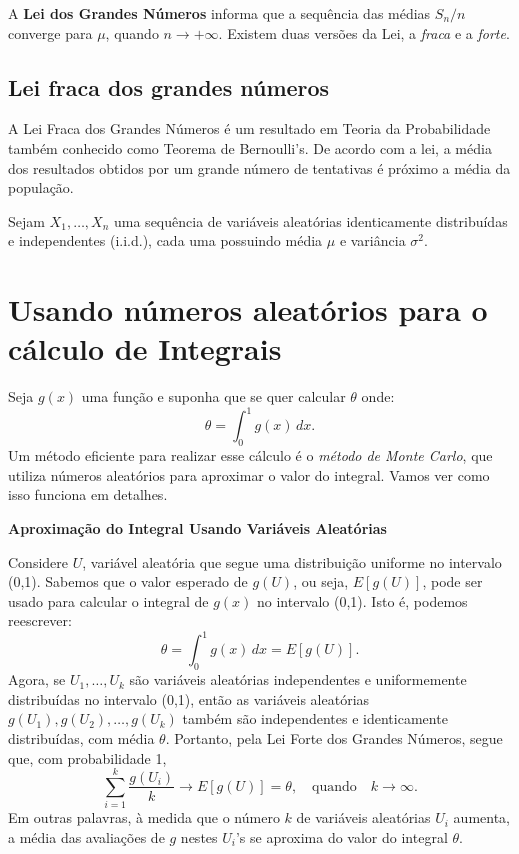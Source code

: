 \documentclass[
]{book}
\begin{document}
A \textbf{Lei dos Grandes Números} informa que a sequência das médias \(S_n/n\) converge para \(\mu\), quando \(n\to +\infty\). Existem duas versões da Lei, a \emph{fraca} e a \emph{forte}.

\section{Lei fraca dos grandes números}\label{lei-fraca-dos-grandes-nuxfameros}

A Lei Fraca dos Grandes Números é um resultado em Teoria da Probabilidade também conhecido como Teorema de Bernoulli's. De acordo com a lei, a média dos resultados obtidos por um grande número de tentativas é próximo a média da população.

Sejam \(X_1,\ldots,X_n\) uma sequência de variáveis aleatórias identicamente distribuídas e independentes (i.i.d.), cada uma possuindo média \(\mu\) e variância \(\sigma^2\).

\chapter{Usando números aleatórios para o cálculo de Integrais}\label{usando-nuxfameros-aleatuxf3rios-para-o-cuxe1lculo-de-integrais}

Seja \(g(x)\) uma função e suponha que se quer calcular \(\theta\) onde:
\[\theta = \int_{0}^{1}g(x)\, dx.\] Um método eficiente para realizar
esse cálculo é o \emph{método de Monte Carlo}, que utiliza números aleatórios
para aproximar o valor do integral. Vamos ver como isso funciona em
detalhes.

\textbf{Aproximação do Integral Usando Variáveis Aleatórias}

Considere \(U\), variável aleatória que segue uma distribuição uniforme no
intervalo (0,1). Sabemos que o valor esperado de \(g(U)\), ou seja,
\(E[g(U)]\), pode ser usado para calcular o integral de \(g(x)\) no
intervalo (0,1). Isto é, podemos reescrever:
\[\theta = \int_{0}^{1}g(x)\,dx = E[g(U)].\] Agora, se \(U_1,\ldots,U_k\)
são variáveis aleatórias independentes e uniformemente distribuídas no
intervalo (0,1), então as variáveis aleatórias
\(g(U_1),g(U_2),\ldots,g(U_k)\) também são independentes e identicamente
distribuídas, com média \(\theta\). Portanto, pela Lei Forte dos Grandes
Números, segue que, com probabilidade 1,
\[\sum_{i=1}^{k}\frac{g(U_i)}{k} \longrightarrow E[g(U)]=\theta, \quad \text{quando} \quad k\rightarrow \infty.\]
Em outras palavras, à medida que o número \(k\) de variáveis aleatórias
\(U_i\) aumenta, a média das avaliações de \(g\) nestes \(U_i\)'s se aproxima
do valor do integral \(\theta\).
\end{document}
